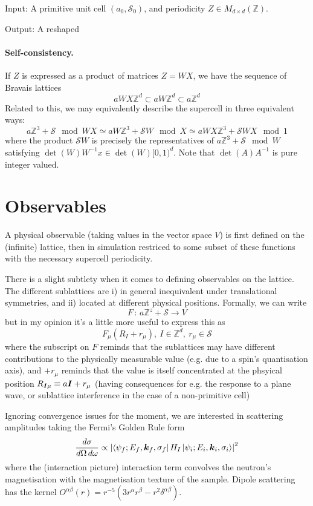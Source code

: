 \documentclass[12pt,a4paper]{article}
\newcommand\bs[1]{\ensuremath\boldsymbol{#1}}
\begin{document}
Input: A primitive unit cell $(a_0, \mathcal{S}_0)$, and periodicity $Z \in M_{d\times d}(\mathbb{Z})$.

Output: A reshaped 


\paragraph{Self-consistency.}
If $Z$ is expressed as a product of matrices $Z = W X$, we have the sequence of Bravais lattices
\[
    a W X \mathbb{Z}^d \subset a W \mathbb{Z}^d \subset a \mathbb{Z}^d  
\]
Related to this, we may equivalently describe the supercell in three equivalent ways:
\[
    a\mathbb{Z}^3 + \mathcal{S}\mod WX \simeq 
    aW\mathbb{Z}^3 + \mathcal{S} W \mod X \simeq 
    aWX\mathbb{Z}^3 + \mathcal{S} W X  \mod 1
\]
where the product $\mathcal{S} W$ is precisely the representatives of $a\mathbb{Z}^3 + \mathcal{S} \mod W$ satisfying $\det(W) W^{-1} x \in \det(W)[0,1)^d$. Note that $\det(A)A^{-1}$ is pure integer valued.

\section{Observables}

A physical observable (taking values in the vector space $V$) is first defined on the (infinite) lattice, then in simulation restriced to some subset of these functions with the necessary supercell periodicity.

There is a slight subtlety when it comes to defining observables on the lattice. The different sublattices are i) in general inequivalent under translational symmetries, and ii) located at different physical positions. Formally, we can write 
\[
    F\,:\, a\mathbb{Z}^z + \mathcal{S} \to V
\]
but in my opinion it's a little more useful to express this as
\[
    F_\mu(R_I + r_\mu),~I\in\mathbb{Z}^d,~r_\mu \in \mathcal{S}
\]
where the subscript on $F$ reminds that the sublattices may have different contributions to the physically measurable value (e.g. due to a spin's quantisation axis), and $+r_\mu$ reminds that the value is itself concentrated at the phsyical position $R_{\bs{I} \mu} \equiv a \bs{I} + r_\mu$ (having consequences for e.g. the response to a plane wave, or sublattice interference in the case of a non-primitive cell)


Ignoring convergence issues for the moment, we are interested in scattering amplitudes taking the Fermi's Golden Rule form
\begin{equation}
    \frac{d\sigma}{d\Omega\,d\omega} \propto \left|\bra{\psi_f; E_f, \bs{k}_f, \sigma_f} H_I \ket{\psi_i; E_i, \bs{k}_i, \sigma_i} \right|^2
    \label{eq:FGR}
\end{equation}
where the (interaction picture) interaction term convolves the neutron's magnetisation with the magnetisation texture of the sample. Dipole scattering has the kernel $O^{\alpha \beta}(r) = r^{-5} (3 r^\alpha r^\beta - r^2\delta^{\alpha \beta})$.
\end{document}
